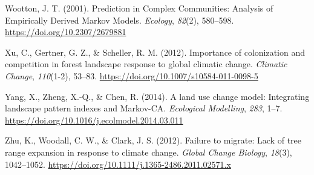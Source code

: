 \documentclass[a4paperpaper,]{article}
\begin{document}
\leavevmode\hypertarget{ref-wootton_prediction_2001}{}%
Wootton, J. T. (2001). Prediction in Complex Communities: Analysis of
Empirically Derived Markov Models. \emph{Ecology}, \emph{82}(2),
580--598. \url{https://doi.org/10.2307/2679881}

\leavevmode\hypertarget{ref-xu_importance_2012}{}%
Xu, C., Gertner, G. Z., \& Scheller, R. M. (2012). Importance of
colonization and competition in forest landscape response to global
climatic change. \emph{Climatic Change}, \emph{110}(1-2), 53--83.
\url{https://doi.org/10.1007/s10584-011-0098-5}

\leavevmode\hypertarget{ref-yang_land_2014}{}%
Yang, X., Zheng, X.-Q., \& Chen, R. (2014). A land use change model:
Integrating landscape pattern indexes and Markov-CA. \emph{Ecological
Modelling}, \emph{283}, 1--7.
\url{https://doi.org/10.1016/j.ecolmodel.2014.03.011}

\leavevmode\hypertarget{ref-zhu_failure_2012}{}%
Zhu, K., Woodall, C. W., \& Clark, J. S. (2012). Failure to migrate:
Lack of tree range expansion in response to climate change. \emph{Global
Change Biology}, \emph{18}(3), 1042--1052.
\url{https://doi.org/10.1111/j.1365-2486.2011.02571.x}
\end{document}
